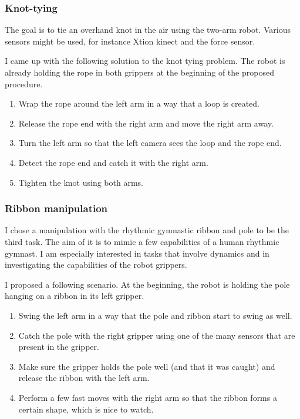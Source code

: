         \subsubsection{Knot-tying}
            The goal is to tie an overhand knot in the air using the two-arm robot. Various sensors might be used, for instance Xtion kinect and the force sensor.

            I came up with the following solution to the knot tying problem. The robot is already holding the rope in both grippers at the beginning of the proposed procedure.
%
            \begin{enumerate}
                \item Wrap the rope around the left arm in a way that a loop is created.
                \item Release the rope end with the right arm and move the right arm away.
                \item Turn the left arm so that the left camera sees the loop and the rope end.
                \item Detect the rope end and catch it with the right arm.
                \item Tighten the knot using both arms.
            \end{enumerate}

        \subsubsection{Ribbon manipulation}
            I chose a manipulation with the rhythmic gymnastic ribbon and pole to be the third task. The aim of it is to mimic a few capabilities of a human rhythmic gymnast. I am especially interested in tasks that involve dynamics and in investigating the capabilities of the robot grippers.

            I proposed a following scenario. At the beginning, the robot is holding the pole hanging on a ribbon in its left gripper.
%
            \begin{enumerate}
                \item Swing the left arm in a way that the pole and ribbon start to swing as well.
                \item Catch the pole with the right gripper using one of the many sensors that are present in the gripper.
                \item Make sure the gripper holds the pole well (and that it was caught) and release the ribbon with the left arm.
                \item Perform a few fast moves with the right arm so that the ribbon forms a certain shape, which is nice to watch.
           \end{enumerate}

